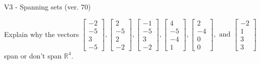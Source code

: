 \begin{exercise}
  \begin{exerciseTitle}V3 - Spanning sets (ver. 70)\end{exerciseTitle}
  \begin{exerciseStatement}
    Explain why the vectors \(\left[\begin{array}{r}
-2 \\
-5 \\
3 \\
-5
\end{array}\right] , \left[\begin{array}{r}
2 \\
-5 \\
2 \\
-2
\end{array}\right] , \left[\begin{array}{r}
-1 \\
-5 \\
3 \\
-2
\end{array}\right] , \left[\begin{array}{r}
4 \\
-5 \\
-4 \\
1
\end{array}\right] , \left[\begin{array}{r}
2 \\
-4 \\
0 \\
0
\end{array}\right] , \text{ and } \left[\begin{array}{r}
-2 \\
1 \\
3 \\
3
\end{array}\right]\) span or don't span \(\mathbb{R}^4\). 
	



\end{exerciseStatement}
\end{exercise}
